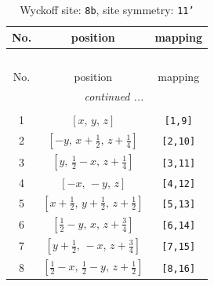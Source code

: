 \documentclass[fleqn,8pt]{jsarticle}
\begin{document}
\begin{longtable}{ccc}
\caption{Wyckoff site: {\tt 8b}, site symmetry: {\tt 11'}}
 \\
 \hline \hline
No. & position & mapping \\ \hline \endfirsthead

\multicolumn{2}{l}{\tablename\ \thetable{}} \\
 \hline \hline
No. & position & mapping \\ \hline \endhead

 \hline \hline
\multicolumn{2}{r}{\footnotesize\it continued ...} \\ \endfoot

 \hline \hline
\multicolumn{2}{r}{} \\ \endlastfoot

1 & $\left[ x,\, y,\, z \right]$ & {\tt [1,9]} \\ \hline
2 & $\left[ - y,\, x + \frac{1}{2},\, z + \frac{1}{4} \right]$ & {\tt [2,10]} \\ \hline
3 & $\left[ y,\, \frac{1}{2} - x,\, z + \frac{1}{4} \right]$ & {\tt [3,11]} \\ \hline
4 & $\left[ - x,\, - y,\, z \right]$ & {\tt [4,12]} \\ \hline
5 & $\left[ x + \frac{1}{2},\, y + \frac{1}{2},\, z + \frac{1}{2} \right]$ & {\tt [5,13]} \\ \hline
6 & $\left[ \frac{1}{2} - y,\, x,\, z + \frac{3}{4} \right]$ & {\tt [6,14]} \\ \hline
7 & $\left[ y + \frac{1}{2},\, - x,\, z + \frac{3}{4} \right]$ & {\tt [7,15]} \\ \hline
8 & $\left[ \frac{1}{2} - x,\, \frac{1}{2} - y,\, z + \frac{1}{2} \right]$ & {\tt [8,16]} \\
\end{longtable}
\end{document}
